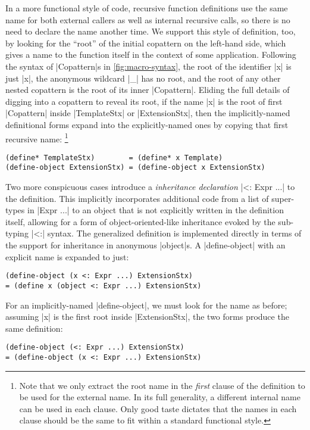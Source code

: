 In a more functional style of code, recursive function definitions use the same name for both external callers as well as internal recursive calls, so there is no need to declare the name another time.
We support this style of definition, too, by looking for the ``root'' of the initial copattern on the left-hand side, which gives a name to the function itself in the context of some application.
Following the syntax of \scm|Copattern|s in \cref{fig:macro-syntax}, the root of the identifier \scm|x| is just \scm|x|, the anonymous wildcard \scm|_| has no root, and the root of any other nested copattern is the root of its inner \scm|Copattern|.
Eliding the full details of digging into a copattern to reveal its root, if the name \scm|x| is the root of first \scm|Copattern| inside \scm|TemplateStx| or \scm|ExtensionStx|, then the implicitly-named definitional forms expand into the explicitly-named ones by copying that first recursive name:%
\footnote{Note that we only extract the root name in the \emph{first} clause of the definition to be used for the external name.
  In its full generality, a different internal name can be used in each clause.
  Only good taste dictates that the names in each clause should be the same to fit within a standard functional style.}
\begin{verbatim}
(define* TemplateStx)        = (define* x Template)
(define-object ExtensionStx) = (define-object x ExtensionStx)
\end{verbatim}

Two more conspicuous cases introduce a \emph{inheritance declaration}
\scm|<: Expr ...| to the definition.
This implicitly incorporates additional code from a list of super-types in \scm|Expr ...| to an object that is not explicitly written in the definition itself, allowing for a form of object-oriented-like inheritance evoked by the sub-typing \scm|<:| syntax.
The generalized definition is implemented directly in terms of the support for inheritance in anonymous \scm|object|s.
A \scm|define-object| with an explicit name is expanded to just:
\begin{verbatim}
(define-object (x <: Expr ...) ExtensionStx)
= (define x (object <: Expr ...) ExtensionStx)
\end{verbatim}
For an implicitly-named \scm|define-object|, we must look for the name as before; assuming \scm|x| is the first root inside \scm|ExtensionStx|, the two forms produce the same definition:
\begin{verbatim}
(define-object (<: Expr ...) ExtensionStx)
= (define-object (x <: Expr ...) ExtensionStx)
\end{verbatim}

